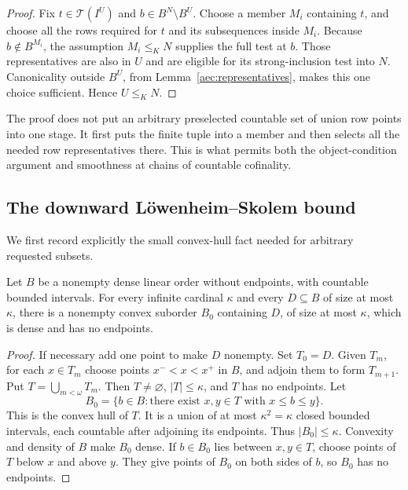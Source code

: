 \begin{proof}
Fix \(t\in\mathcal T(I^U)\) and
\(b\in B^N\setminus B^U\).
Choose a member \(M_i\) containing \(t\), and
choose all the rows required for \(t\) and its
subsequences inside \(M_i\).
Because \(b\notin B^{M_i}\), the assumption
\(M_i\le_K N\) supplies the full test at \(b\).
Those representatives are also in \(U\) and are
eligible for its strong-inclusion test into \(N\).
Canonicality outside \(B^U\), from
Lemma~\ref{aec:representatives}, makes this one
choice sufficient.  Hence \(U\le_K N\).
\end{proof}

The proof does not put an arbitrary preselected countable
set of union row points into one stage.  It first puts the
finite tuple into a member and then selects all the needed
row representatives there.  This is what permits both the
object-condition argument and smoothness at chains of
countable cofinality.

\subsection{The downward L\"owenheim--Skolem bound}

We first record explicitly the small convex-hull fact
needed for arbitrary requested subsets.

\begin{lemma}\label{aec:convex-hull}
Let \(B\) be a nonempty dense linear order without
endpoints, with countable bounded intervals.  For every
infinite cardinal \(\kappa\) and every \(D\subseteq B\)
of size at most \(\kappa\), there is a nonempty convex
suborder \(B_0\) containing \(D\), of size at most
\(\kappa\), which is dense and has no endpoints.
\end{lemma}

\begin{proof}
If necessary add one point to make \(D\) nonempty.
Set \(T_0=D\).  Given \(T_m\), for each \(x\in T_m\)
choose points \(x^-<x<x^+\) in \(B\), and adjoin them
to form \(T_{m+1}\).  Put
\(T=\bigcup_{m<\omega}T_m\).  Then \(T\ne\varnothing\),
\(|T|\le\kappa\), and \(T\) has no endpoints.
Let
\[
 B_0=\{b\in B:\text{there exist }x,y\in T
                       \text{ with }x\le b\le y\}.
\]
This is the convex hull of \(T\).  It is a union of
at most \(\kappa^2=\kappa\) closed bounded intervals,
each countable after adjoining its endpoints.
Thus \(|B_0|\le\kappa\).
Convexity and density of \(B\) make \(B_0\) dense.
If \(b\in B_0\) lies between \(x,y\in T\), choose
points of \(T\) below \(x\) and above \(y\).
They give points of \(B_0\) on both sides of \(b\),
so \(B_0\) has no endpoints.
\end{proof}

